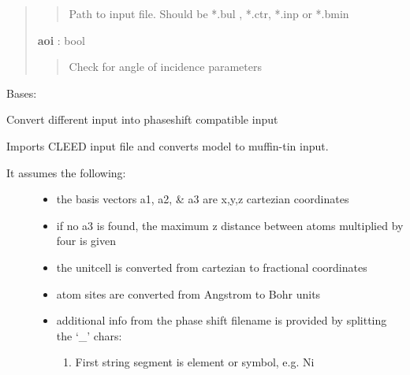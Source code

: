 \documentclass[letterpaper,10pt,english]{sphinxmanual}
\begin{document}
\begin{fulllineitems}
\begin{fulllineitems}
\begin{quote}
\begin{description}
\begin{quote}
Path to input file. Should be *.bul , *.ctr, *.inp or *.bmin
\end{quote}

\textbf{aoi} : bool
\begin{quote}

Check for angle of incidence parameters
\end{quote}

\end{description}\end{quote}

\end{fulllineitems}


\end{fulllineitems}


\begin{fulllineitems}
\label{modules:phaseshifts.leed.Converter}
Bases: 

Convert different input into phaseshift compatible input

\begin{fulllineitems}
\label{modules:phaseshifts.leed.Converter.import_CLEED}
Imports CLEED input file and converts model to muffin-tin input.
\begin{description}
\item[{It assumes the following:}] \leavevmode\begin{itemize}
\item {} 
the basis vectors a1, a2, \& a3 are x,y,z cartezian coordinates

\item {} 
if no a3 is found, the maximum z distance between atoms multiplied
by four is given

\item {} 
the unitcell is converted from cartezian to fractional coordinates

\item {} 
atom sites are converted from Angstrom to Bohr units

\item {} 
additional info from the phase shift filename is provided by 
splitting the `\_' chars:
\begin{enumerate}
\item {} 
First string segment is element or symbol, e.g. Ni


\end{enumerate}
\end{itemize}
\end{description}
\end{fulllineitems}
\end{fulllineitems}
\end{document}
